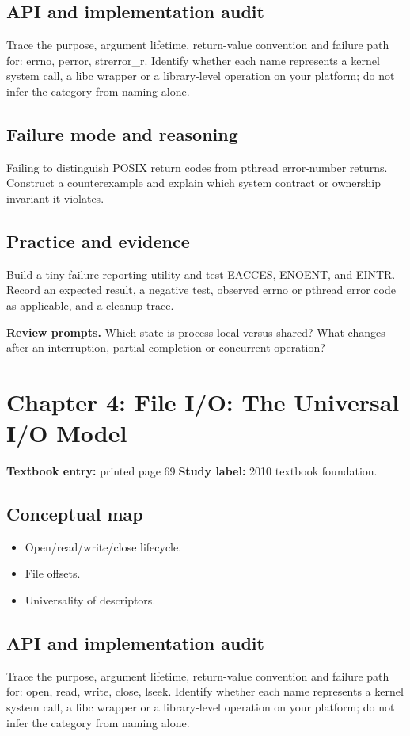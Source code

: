 \documentclass[11pt,letterpaper,oneside]{report}
\begin{document}
\subsection{API and implementation audit}
Trace the purpose, argument lifetime, return-value convention and failure path for: errno, perror, strerror\_r. Identify whether each name represents a kernel system call, a libc wrapper or a library-level operation on your platform; do not infer the category from naming alone.

\subsection{Failure mode and reasoning}
Failing to distinguish POSIX return codes from pthread error-number returns. Construct a counterexample and explain which system contract or ownership invariant it violates.

\subsection{Practice and evidence}
Build a tiny failure-reporting utility and test EACCES, ENOENT, and EINTR. Record an expected result, a negative test, observed errno or pthread error code as applicable, and a cleanup trace.

\textbf{Review prompts.} Which state is process-local versus shared? What changes after an interruption, partial completion or concurrent operation?

\section{Chapter 4: File I/O: The Universal I/O Model}
\textbf{Textbook entry:} printed page 69.\quad \textbf{Study label:} 2010 textbook foundation.

\subsection{Conceptual map}
\begin{itemize}
\item Open/read/write/close lifecycle.
\item File offsets.
\item Universality of descriptors.
\end{itemize}
\subsection{API and implementation audit}
Trace the purpose, argument lifetime, return-value convention and failure path for: open, read, write, close, lseek. Identify whether each name represents a kernel system call, a libc wrapper or a library-level operation on your platform; do not infer the category from naming alone.
\end{document}
